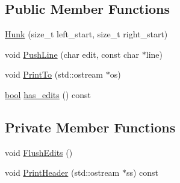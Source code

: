 \subsection*{Public Member Functions}
\begin{DoxyCompactItemize}
\item 
\hyperlink{classtesting_1_1internal_1_1edit__distance_1_1anonymous__namespace_02gtest_8cc_03_1_1Hunk_a16c5bd884105b1d61b1ada25ab5bef74}{Hunk} (size\+\_\+t left\+\_\+start, size\+\_\+t right\+\_\+start)
\item 
void \hyperlink{classtesting_1_1internal_1_1edit__distance_1_1anonymous__namespace_02gtest_8cc_03_1_1Hunk_aa4203a217bfcb6f4ccff08eda70975d3}{Push\+Line} (char edit, const char $\ast$line)
\item 
void \hyperlink{classtesting_1_1internal_1_1edit__distance_1_1anonymous__namespace_02gtest_8cc_03_1_1Hunk_a3a9f10e847b1c45ab10eceb0b5f71dd2}{Print\+To} (std\+::ostream $\ast$os)
\item 
\hyperlink{classbool}{bool} \hyperlink{classtesting_1_1internal_1_1edit__distance_1_1anonymous__namespace_02gtest_8cc_03_1_1Hunk_ae045c8f79bdf49589ae765c8da106279}{has\+\_\+edits} () const
\end{DoxyCompactItemize}
\subsection*{Private Member Functions}
\begin{DoxyCompactItemize}
\item 
void \hyperlink{classtesting_1_1internal_1_1edit__distance_1_1anonymous__namespace_02gtest_8cc_03_1_1Hunk_a8279c19ffd74766256c2aec97cd25378}{Flush\+Edits} ()
\item 
void \hyperlink{classtesting_1_1internal_1_1edit__distance_1_1anonymous__namespace_02gtest_8cc_03_1_1Hunk_a5752d6e583b7363218a4c61ffdbffb63}{Print\+Header} (std\+::ostream $\ast$ss) const
\end{DoxyCompactItemize}
